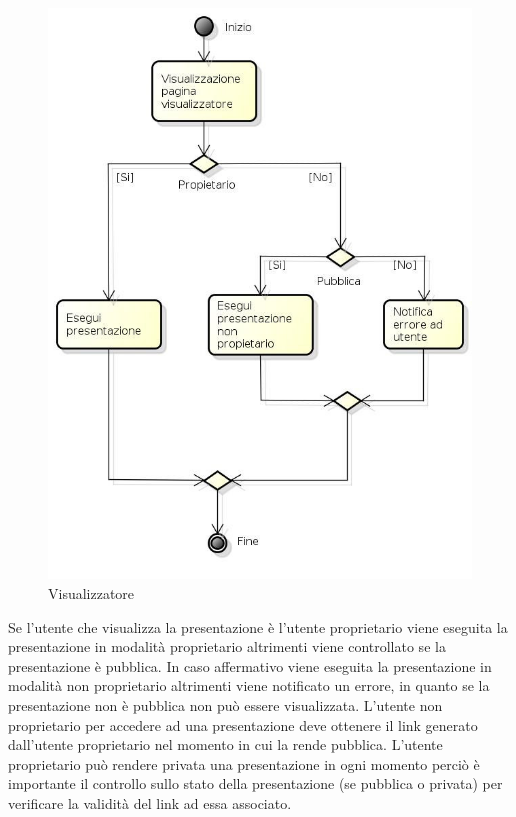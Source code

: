 \begin{figure}[h!]
		\centering
		\includegraphics[scale=.5]{img/attivita/Visualizzatore.jpg}
		\caption{Visualizzatore}
		\label{fig:Visualizzatore}
\end{figure} 

Se l'utente che visualizza la presentazione è l'utente proprietario viene eseguita la presentazione in modalità proprietario altrimenti viene controllato se la presentazione è pubblica. In caso affermativo viene eseguita la presentazione in modalità non proprietario altrimenti viene notificato un errore, in quanto se la presentazione non è pubblica non può essere visualizzata. L'utente non proprietario per accedere ad una presentazione deve ottenere il link generato dall'utente proprietario nel momento in cui la rende pubblica. L'utente proprietario può rendere privata una presentazione in ogni momento perciò è importante il controllo sullo stato della presentazione (se pubblica o privata) per verificare la validità del link ad essa associato.

